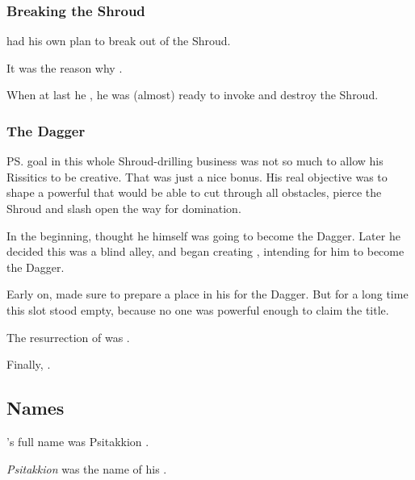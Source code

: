 \subsubsection{Breaking the Shroud}
\Secherdamon{} had his own plan to break out of the Shroud. 

It was the reason why . 

When at last he , he was (almost) ready to invoke  and destroy the Shroud. 





\subsubsection{The Dagger}
%
\ps{\Secherdamon} goal in this whole Shroud-drilling business was not so much to allow his Rissitics to be creative. 
That was just a nice bonus.
His real objective was to shape a powerful \vertex{} that would be able to cut through all obstacles, pierce the Shroud and slash open the way for \xsic{} domination. 

In the beginning, \Secherdamon{} thought he himself was going to become the Dagger. 
Later he decided this was a blind alley, and began creating \Vizsherioch, intending for him to become the Dagger. 

Early on, \Secherdamon{} made sure to prepare a place in his \matrix{} for the Dagger. 
But for a long time this slot stood empty, because no one was powerful enough to claim the title. 

The resurrection of \Nithdornazsh{} was . 

Finally, . 









\subsection{Names}
\Secherdamon's full name was Psitakkion \Irocas \Veldraxx \Nexagglachel \Secherdamon. 

\emph{Psitakkion} was the name of his .


